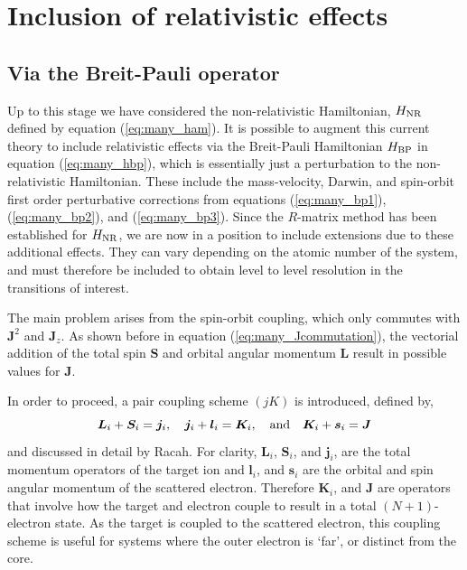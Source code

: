 \section{Inclusion of relativistic effects}\label{sec:relativistic}
\subsection{Via the Breit-Pauli operator}
Up to this stage we have considered the non-relativistic Hamiltonian, $H_{{\rm NR}}$ defined by equation (\ref{eq:many_ham}). It is possible to augment this current theory to include relativistic effects via the Breit-Pauli Hamiltonian $H_{{\rm BP}}$ in equation (\ref{eq:many_hbp}), which is essentially just a perturbation to the non-relativistic Hamiltonian. These include the mass-velocity, Darwin, and spin-orbit first order perturbative corrections from equations (\ref{eq:many_bp1}), (\ref{eq:many_bp2}), and (\ref{eq:many_bp3}). Since the $R$-matrix method has been established for $H_{{\rm NR}}$, we are now in a position to include extensions due to these additional effects. They can vary depending on the atomic number of the system, and must therefore be included to obtain level to level resolution in the transitions of interest.

 The main problem arises from the spin-orbit coupling, which only commutes with $\boldsymbol{J}^2$ and $\boldsymbol{J}_z$. As shown before in equation (\ref{eq:many_Jcommutation}), the vectorial addition of the total spin $\boldsymbol{S}$ and orbital angular momentum $\boldsymbol{L}$ result in possible values for $\boldsymbol{J}$.

In order to proceed, a pair coupling scheme $(jK)$ is introduced, defined by,
\begin{equation}\label{eq:rmat_jk}
\boldsymbol{L}_i+\boldsymbol{S}_i=\boldsymbol{j}_i, ~~~ \boldsymbol{j}_i+\boldsymbol{l}_i=\boldsymbol{K}_i, ~~~ {\rm and} ~~~ \boldsymbol{K}_i+\boldsymbol{s}_i=\boldsymbol{J}
\end{equation}
and discussed in detail by Racah. For clarity, $\boldsymbol{L}_i$, $\boldsymbol{S}_i$, and $\boldsymbol{j}_i$, are the total momentum operators of the target ion and $\boldsymbol{l}_i$, and $\boldsymbol{s}_i$ are the orbital and spin angular momentum of the scattered electron. Therefore $\boldsymbol{K}_i$, and $\boldsymbol{J}$ are operators that involve how the target and electron couple to result in a total $(N+1)$-electron state. As the target is coupled to the scattered electron, this coupling scheme is useful for systems where the outer electron is `far', or distinct from the core.

